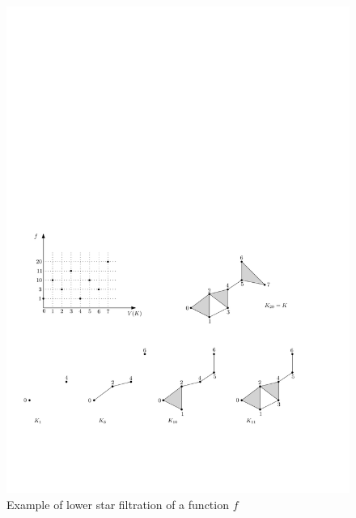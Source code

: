 \begin{figure}[h] \centering
\includegraphics[width = 13cm]{figures/LowStar} \caption[Lower-star filtration]{\label{fig:lowstar}
Example of lower star filtration of a function $f$} 
\end{figure}



